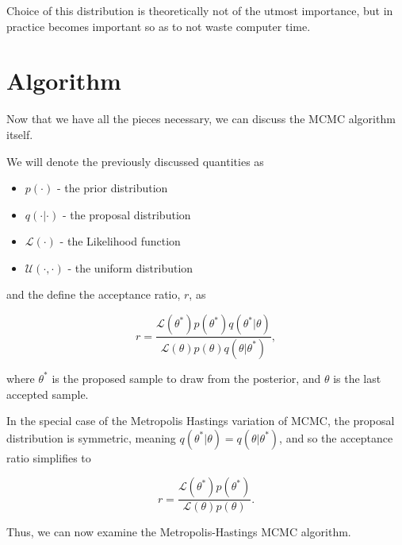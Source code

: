 \documentclass[12pt]{article}
\begin{document}
    Choice of this distribution is theoretically not of the utmost importance, but in practice becomes important so as to not waste computer time.


\section{Algorithm}

    Now that we have all the pieces necessary, we can discuss the MCMC algorithm itself.

    We will denote the previously discussed quantities as

    \begin{itemize}
        \item $p(\cdot)$ - the prior distribution
        \item $q(\cdot|\cdot)$ - the proposal distribution
        \item $\mathcal{L}(\cdot)$ - the Likelihood function
        \item $\mathcal{U}(\cdot,\cdot)$ - the uniform distribution
    \end{itemize}

    and the define the acceptance ratio, $r$, as

    $$
        r = \frac{\mathcal{L}(\theta^*)p(\theta^*)q(\theta^*|\theta)}{\mathcal{L}(\theta)p(\theta)q(\theta|\theta^*)},
    $$

    where $\theta^*$ is the proposed sample to draw from the posterior, and $\theta$ is the last accepted sample.

    In the special case of the Metropolis Hastings variation of MCMC, the proposal distribution is symmetric, meaning $q(\theta^*|\theta) = q(\theta|\theta^*)$, and so the acceptance ratio simplifies to

    $$
        r = \frac{\mathcal{L}(\theta^*)p(\theta^*)}{\mathcal{L}(\theta)p(\theta)}.
    $$

    Thus, we can now examine the Metropolis-Hastings MCMC algorithm.
\end{document}
